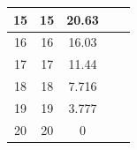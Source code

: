 \documentclass[15pt,a5paper,reqno]{article}
\begin{document}
\begin{center}
\begin{tabular}{|c|c|c|c|c|}
                        15   &             15 & 20.63                & &\\ \hline
                        16   &             16 & 16.03                & &\\ \hline
                        17   &             17 & 11.44                & &\\ \hline
                        18   &             18 & 7.716                & &\\ \hline
                        19   &             19 & 3.777                & &\\ \hline
                        20   &             20 & 0                    & &\\ \hline
            \end{tabular}
        \end{center}
\end{document}
